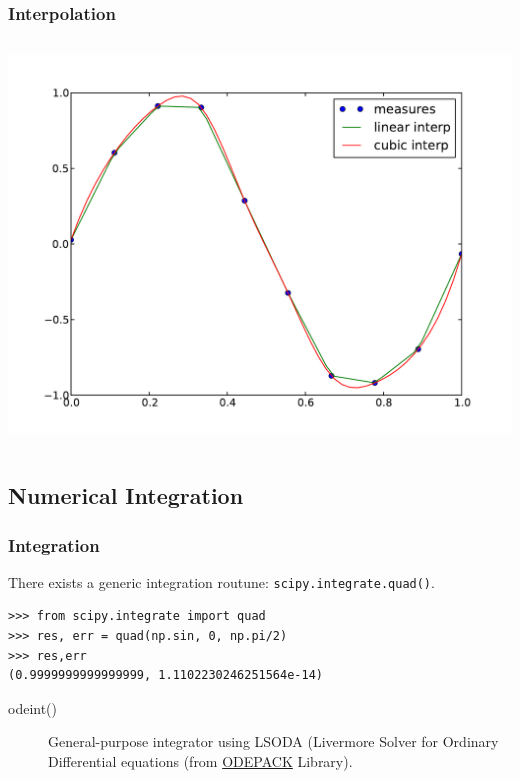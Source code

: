 \documentclass[10pt,colorlinks]{beamer}
\begin{document}
\begin{frame}[fragile]\frametitle{Interpolation}
\begin{columns}[c]
\includegraphics[width=\textwidth]{plwfigis/CursP_3_figure52}


\end{columns}
\end{frame}

\subsection{Numerical Integration}
\begin{frame}[fragile]\frametitle{Integration}
There exists a generic integration routune: \verb|scipy.integrate.quad()|.   
\begin{verbatim}
>>> from scipy.integrate import quad
>>> res, err = quad(np.sin, 0, np.pi/2)
>>> res,err
(0.9999999999999999, 1.1102230246251564e-14)
\end{verbatim}

\begin{description}
    \item[odeint()]  General-purpose integrator using LSODA (Livermore Solver for Ordinary Differential equations (from \href{http://people.sc.fsu.edu/~jburkardt/f77_src/odepack/odepack.html}{ODEPACK} Library).  
\end{description}

\end{frame}
\end{document}
